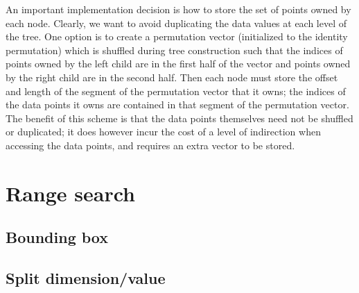 \documentclass[journal]{IEEEtran}
\begin{document}
An important implementation decision is how to store the set of points owned by each
node.  Clearly, we want to avoid duplicating the data values at each level of the tree.
One option is to create a permutation vector (initialized to the identity permutation)
which is shuffled during tree construction
such that the indices of points owned by the left child are in the first half of the vector
and points owned by the right child are in the second half.  Then each node must store
the offset and length of the segment of the permutation vector that it owns; the indices of
the data points it owns are contained in that segment of the permutation vector.
The benefit of this scheme is that the data points themselves need not be shuffled or duplicated;
it does however incur the cost of a level of indirection when accessing the data points,
and requires an extra vector to be stored.


 

\section{Range search}

\subsection{Bounding box}



\subsection{Split dimension/value}










\end{document}
